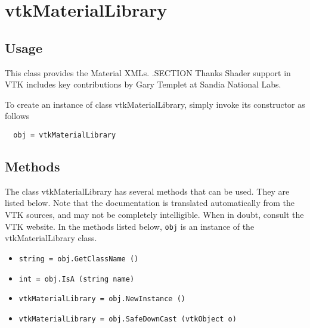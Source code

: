 \section{vtkMaterialLibrary}

\subsection{Usage}

 This class provides the Material XMLs.
 .SECTION Thanks
 Shader support in VTK includes key contributions by Gary Templet at 
 Sandia National Labs.

To create an instance of class vtkMaterialLibrary, simply
invoke its constructor as follows
\begin{verbatim}
  obj = vtkMaterialLibrary
\end{verbatim}
\subsection{Methods}

The class vtkMaterialLibrary has several methods that can be used.
  They are listed below.
Note that the documentation is translated automatically from the VTK sources,
and may not be completely intelligible.  When in doubt, consult the VTK website.
In the methods listed below, \verb|obj| is an instance of the vtkMaterialLibrary class.
\begin{itemize}
\item  \verb|string = obj.GetClassName ()|

\item  \verb|int = obj.IsA (string name)|

\item  \verb|vtkMaterialLibrary = obj.NewInstance ()|

\item  \verb|vtkMaterialLibrary = obj.SafeDownCast (vtkObject o)|

\end{itemize}
